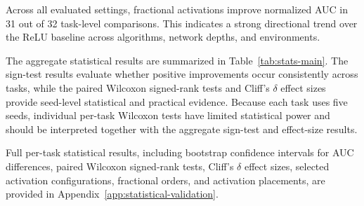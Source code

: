 
Across all evaluated settings, fractional activations improve normalized AUC in 31 out of 32 task-level comparisons. This indicates a strong directional trend over the ReLU baseline across algorithms, network depths, and environments.

The aggregate statistical results are summarized in Table~\ref{tab:stats-main}. The sign-test results evaluate whether positive improvements occur consistently across tasks, while the paired Wilcoxon signed-rank tests and Cliff's $\delta$ effect sizes provide seed-level statistical and practical evidence. Because each task uses five seeds, individual per-task Wilcoxon tests have limited statistical power and should be interpreted together with the aggregate sign-test and effect-size results.

Full per-task statistical results, including bootstrap confidence intervals for AUC differences, paired Wilcoxon signed-rank tests, Cliff's $\delta$ effect sizes, selected activation configurations, fractional orders, and activation placements, are provided in Appendix~\ref{app:statistical-validation}.
